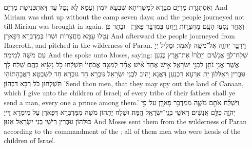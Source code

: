 {וְאִסְתְּגַרַת מִרְיָם מִבַּרָא לְמַשְׁרִיתָא שִׁבְעָא יוֹמִין וְעַמָּא לָא נְטַל עַד דְּאִתְכְּנֵישַׁת מִרְיָם׃}
{And Miriam was shut up without the camp seven days; and the people journeyed not till Miriam was brought in again.}{}
{וְאַחַ֛ר נָסְע֥וּ הָעָ֖ם מֵחֲצֵר֑וֹת וַֽיַּחֲנ֖וּ בְּמִדְבַּ֥ר פָּארָֽן׃ \petucha }
{וּבָתַר כֵּן נְטַלוּ עַמָּא מֵחֲצֵרוֹת וּשְׁרוֹ בְּמַדְבְּרָא דְּפָארָן׃}
{And afterward the people journeyed from Hazeroth, and pitched in the wilderness of Paran.}{}
\newperek
{}
{וַיְדַבֵּ֥ר יְהֹוָ֖ה אֶל־מֹשֶׁ֥ה לֵּאמֹֽר׃}
{וּמַלֵּיל יְיָ עִם מֹשֶׁה לְמֵימַר׃}
{And the \lord\space spoke unto Moses, saying:}{}
{שְׁלַח־לְךָ֣ אֲנָשִׁ֗ים וְיָתֻ֙רוּ֙ אֶת־אֶ֣רֶץ כְּנַ֔עַן אֲשֶׁר־אֲנִ֥י נֹתֵ֖ן לִבְנֵ֣י יִשְׂרָאֵ֑ל אִ֣ישׁ אֶחָד֩ אִ֨ישׁ אֶחָ֜ד לְמַטֵּ֤ה אֲבֹתָיו֙ תִּשְׁלָ֔חוּ כֹּ֖ל נָשִׂ֥יא בָהֶֽם׃
}
{שְׁלַח לָךְ גּוּבְרִין וִיאַלְּלוּן יָת אַרְעָא דִּכְנַעַן דַּאֲנָא יָהֵיב לִבְנֵי יִשְׂרָאֵל גּוּבְרָא חַד גּוּבְרָא חַד לְשִׁבְטָא דַּאֲבָהָתוֹהִי תִּשְׁלְחוּן כֹּל רַבָּא דִּבְהוֹן׃}
{’Send thou men, that they may spy out the land of Canaan, which I give unto the children of Israel; of every tribe of their fathers shall ye send a man, every one a prince among them.’}{}
{וַיִּשְׁלַ֨ח אֹתָ֥ם מֹשֶׁ֛ה מִמִּדְבַּ֥ר פָּארָ֖ן עַל־פִּ֣י יְהֹוָ֑ה כֻּלָּ֣ם אֲנָשִׁ֔ים רָאשֵׁ֥י בְנֵֽי־יִשְׂרָאֵ֖ל הֵֽמָּה׃
}
{וּשְׁלַח יָתְהוֹן מֹשֶׁה מִמַּדְבְּרָא דְּפָארָן עַל מֵימְרָא דַּייָ כּוּלְּהוֹן גּוּבְרִין רֵישֵׁי בְנֵי יִשְׂרָאֵל אִנּוּן׃}
{And Moses sent them from the wilderness of Paran according to the commandment of the \lord; all of them men who were heads of the children of Israel.}{}
